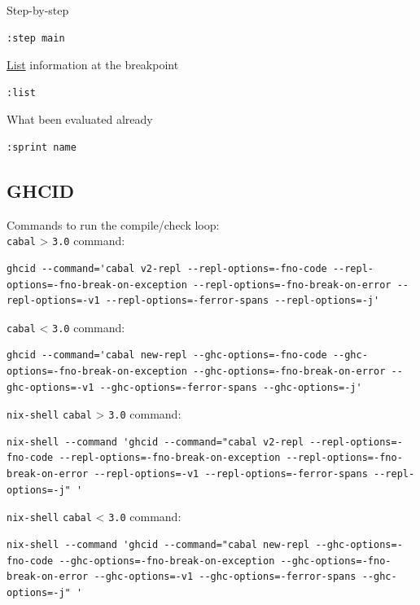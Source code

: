 \documentclass[11pt]{article}
\begin{document}
Step-by-step\\
\begin{verbatim}
:step main
\end{verbatim}

\hyperref[org874a6e0]{List} information at the breakpoint\\
\begin{verbatim}
:list
\end{verbatim}

What been evaluated already\\
\begin{verbatim}
:sprint name
\end{verbatim}

\subsection{\label{org4a49e81}GHCID}
\label{sec:org56197ba}

Commands to run the compile/check loop:\\

\texttt{cabal} > \texttt{3.0} command:\\
\begin{verbatim}
ghcid --command='cabal v2-repl --repl-options=-fno-code --repl-options=-fno-break-on-exception --repl-options=-fno-break-on-error --repl-options=-v1 --repl-options=-ferror-spans --repl-options=-j'
\end{verbatim}

\texttt{cabal} < \texttt{3.0} command:\\
\begin{verbatim}
ghcid --command='cabal new-repl --ghc-options=-fno-code --ghc-options=-fno-break-on-exception --ghc-options=-fno-break-on-error --ghc-options=-v1 --ghc-options=-ferror-spans --ghc-options=-j'
\end{verbatim}

\texttt{nix-shell} \texttt{cabal} > \texttt{3.0} command:\\
\begin{verbatim}
nix-shell --command 'ghcid --command="cabal v2-repl --repl-options=-fno-code --repl-options=-fno-break-on-exception --repl-options=-fno-break-on-error --repl-options=-v1 --repl-options=-ferror-spans --repl-options=-j" '
\end{verbatim}

\texttt{nix-shell} \texttt{cabal} < \texttt{3.0} command:\\
\begin{verbatim}
nix-shell --command 'ghcid --command="cabal new-repl --ghc-options=-fno-code --ghc-options=-fno-break-on-exception --ghc-options=-fno-break-on-error --ghc-options=-v1 --ghc-options=-ferror-spans --ghc-options=-j" '

\end{verbatim}
\end{document}
